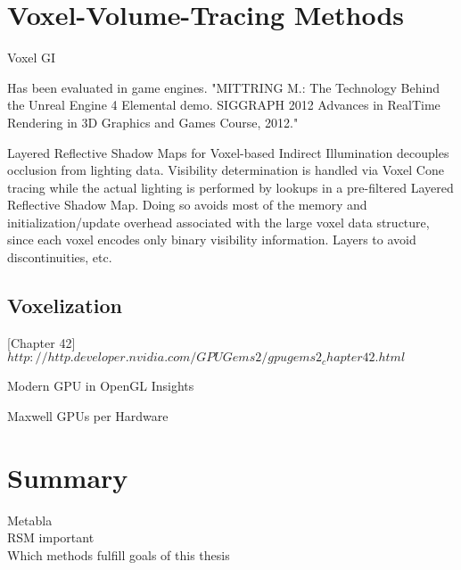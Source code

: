 \documentclass[thesis.tex]{subfiles}
\begin{document}

\section{Voxel-Volume-Tracing Methods} \label{sec:prev:voxelmethods}

Voxel GI

 Has been evaluated in game engines. "MITTRING M.: The Technology Behind the Unreal Engine 4 Elemental demo. SIGGRAPH 2012 Advances in RealTime Rendering in 3D Graphics and Games Course, 2012." 

Layered Reflective Shadow Maps for Voxel-based Indirect Illumination decouples occlusion from lighting data.
Visibility determination is handled via Voxel Cone tracing while the actual lighting is performed by lookups in a pre-filtered Layered Reflective Shadow Map.
Doing so avoids most of the memory and initialization/update overhead associated with the large voxel data structure, since each voxel encodes only binary visibility information.
Layers to avoid discontinuities, etc.

\subsection{Voxelization}

\cite{bib:GPUGems2}[Chapter 42] $http://http.developer.nvidia.com/GPUGems2/gpugems2_chapter42.html$

Modern GPU in OpenGL Insights \cite{bib:openglinsightsvoxel}

Maxwell GPUs per Hardware

\section{Summary}
Metabla\\
RSM important\\
Which methods fulfill goals of this thesis

\subfilebib %
\end{document}
